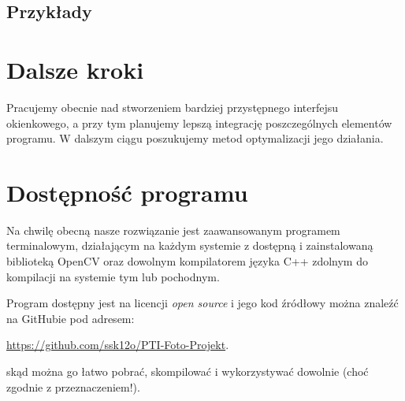 \documentclass[]{mwart}
\begin{document}
\subsection{Przykłady}









\newpage

\section{Dalsze kroki}
Pracujemy obecnie nad stworzeniem bardziej przystępnego interfejsu okienkowego, a przy tym
planujemy lepszą integrację poszczególnych elementów programu.
W dalszym ciągu poszukujemy metod optymalizacji jego działania.

\section{Dostępność programu}
Na chwilę obecną nasze rozwiązanie jest zaawansowanym programem terminalowym,
działającym na każdym systemie z dostępną i zainstalowaną biblioteką OpenCV oraz
dowolnym kompilatorem języka C++ zdolnym do kompilacji na systemie tym lub pochodnym.

Program dostępny jest na licencji \textit{open source} i jego kod źródłowy można znaleźć na GitHubie
pod adresem:
\begin{center}
    \url{https://github.com/ssk12o/PTI-Foto-Projekt}.
\end{center}
skąd można go łatwo pobrać, skompilować i wykorzystywać dowolnie (choć zgodnie z przeznaczeniem!).




\newpage
\end{document}
